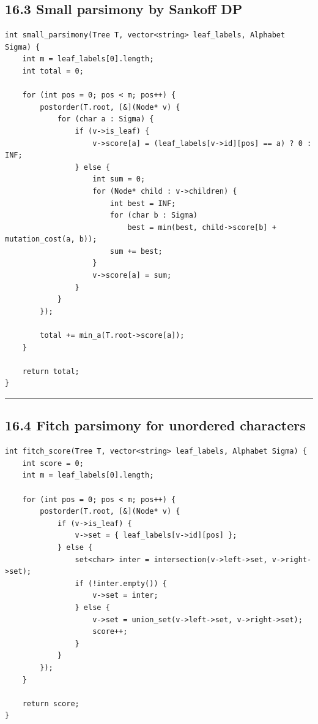 \documentclass[11pt]{article}
\begin{document}
\subsection{16.3 Small parsimony by Sankoff DP}\label{small-parsimony-by-sankoff-dp}

\begin{verbatim}
int small_parsimony(Tree T, vector<string> leaf_labels, Alphabet Sigma) {
    int m = leaf_labels[0].length;
    int total = 0;

    for (int pos = 0; pos < m; pos++) {
        postorder(T.root, [&](Node* v) {
            for (char a : Sigma) {
                if (v->is_leaf) {
                    v->score[a] = (leaf_labels[v->id][pos] == a) ? 0 : INF;
                } else {
                    int sum = 0;
                    for (Node* child : v->children) {
                        int best = INF;
                        for (char b : Sigma)
                            best = min(best, child->score[b] + mutation_cost(a, b));
                        sum += best;
                    }
                    v->score[a] = sum;
                }
            }
        });

        total += min_a(T.root->score[a]);
    }

    return total;
}
\end{verbatim}

\begin{center}\rule{0.5\linewidth}{0.5pt}\end{center}

\subsection{16.4 Fitch parsimony for unordered characters}\label{fitch-parsimony-for-unordered-characters}

\begin{verbatim}
int fitch_score(Tree T, vector<string> leaf_labels, Alphabet Sigma) {
    int score = 0;
    int m = leaf_labels[0].length;

    for (int pos = 0; pos < m; pos++) {
        postorder(T.root, [&](Node* v) {
            if (v->is_leaf) {
                v->set = { leaf_labels[v->id][pos] };
            } else {
                set<char> inter = intersection(v->left->set, v->right->set);
                if (!inter.empty()) {
                    v->set = inter;
                } else {
                    v->set = union_set(v->left->set, v->right->set);
                    score++;
                }
            }
        });
    }

    return score;
}
\end{verbatim}
\end{document}

